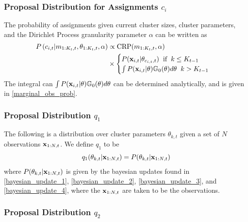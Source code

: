 \documentclass[smallcondensed, final]{svjour3}
\begin{document}
\subsubsection{Proposal Distribution for Assignments $c_{i}$}
\label{sec:smc_proposal_1}

The probability of assignments given current cluster sizes, cluster parameters, and the Dirichlet Process granularity parameter $\alpha$ can be written as
\begin{equation}
\label{smc_assig_eqn}
\begin{split}
P \left( c_{i,t} | m_{1:K_{t}, t}, \theta_{1:K_{t}, t}, \alpha \right) &\propto
\text{CRP}(m_{1:K_{t}, t}, \alpha) \\ &\times
\begin{cases}
P(\bold{x}_{i,t} | \theta_{c_{i,t},t}) \hspace{2mm} \text{if} \hspace{2mm} k \leq K_{t-1} \\
\int P(\bold{x}_{i,t} | \theta) \mathbb{G}_{0}(\theta)d\theta \hspace{2mm} k > K_{t-1}
\end{cases}
\end{split}
\end{equation}
The integral can $\int P(\bold{x}_{i,t} | \theta) \mathbb{G}_{0}(\theta)d\theta$ can be determined analytically, and is given in \eqref{marginal_obs_prob}.





\subsubsection{Proposal Distribution $q_{1}$}
\label{sec:smc_proposal_2}

The following is a distribution over cluster parameters $\theta_{k,t}$ given a set of $N$ observations $\bold{x}_{1:N, t}$. We define $q_{1}$ to be
\begin{equation}
\label{smc_q1_eqn}
q_{1}(\theta_{k,t} | \bold{x}_{1:N,t}) = P(\theta_{k,t} | \bold{x}_{1:N,t})
\end{equation}
where $P(\theta_{k,t} | \bold{x}_{1:N,t})$ is given by the bayesian updates found in \eqref{bayesian_update_1}, \eqref{bayesian_update_2}, \eqref{bayesian_update_3}, and \eqref{bayesian_update_4}, where the $\bold{x}_{1:N,t}$ are taken to be the observations.





\subsubsection{Proposal Distribution $q_{2}$}
\label{sec:smc_proposal_3}
\end{document}
